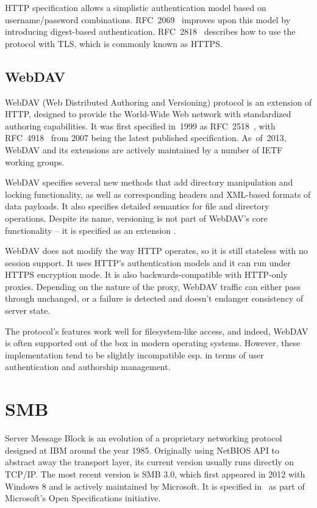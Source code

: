 HTTP specification allows a simplistic authentication model based on username/password combinations.
RFC~2069~\cite{rfc2069} improves upon this model by introducing digest-based authentication.
RFC~2818~\cite{rfc2818} describes how to use the protocol with TLS, which is commonly known as HTTPS.

\subsection{WebDAV}

WebDAV (Web Distributed Authoring and Versioning) protocol is an extension of HTTP, designed to provide the
World-Wide Web network with standardized authoring capabilities. It was first specified in~1999 as
RFC~2518~\cite{rfc2518}, with RFC~4918~\cite{rfc4918} from 2007 being the latest published specification.
As~of~2013, WebDAV and its extensions are actively maintained by a number of IETF working groups.

WebDAV specifies several new methods that add directory manipulation and locking functionality, as well as
corresponding headers and XML-based formats of data payloads. It also specifies detailed semantics for file
and directory operations. Despite its name, versioning is not part of WebDAV's core functionality -- it is
specified as an extension \cite{rfc3253}.

WebDAV does not modify the way HTTP operates, so it is still stateless with no session support. It uses HTTP's
authentication models and it can run under HTTPS encryption mode. It is also backwards-compatible with
HTTP-only proxies. Depending on the nature of the proxy, WebDAV traffic can either pass through unchanged, or
a failure is detected and doesn't endanger consistency of server state.

The protocol's features work well for filesystem-like access, and indeed, WebDAV is often supported out of the
box in modern operating systems. However, these implementation tend to be slightly incompatible esp. in terms
of user authentication and authorship management.

\section{SMB}

Server Message Block is an evolution of a proprietary networking protocol designed at IBM around the year
1985. Originally using NetBIOS API to abstract away the transport layer, its current version usually runs
directly on TCP/IP.  The most recent version is SMB 3.0, which first appeared in 2012 with Windows 8 and is
actively maintained by Microsoft. It is specified in~\cite{mssmb2} as part of Microsoft's Open Specifications
initiative.

